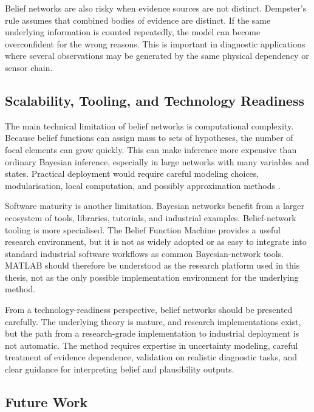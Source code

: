 \documentclass[runningheads]{llncs}
\begin{document}
Belief networks are also risky when evidence sources are not distinct. Dempster's rule assumes that combined bodies of evidence are distinct. If the same underlying information is counted repeatedly, the model can become overconfident for the wrong reasons. This is important in diagnostic applications where several observations may be generated by the same physical dependency or sensor chain.

\subsection{Scalability, Tooling, and Technology Readiness}
\label{sec:scalability_tooling_readiness}

The main technical limitation of belief networks is computational complexity. Because belief functions can assign mass to sets of hypotheses, the number of focal elements can grow quickly. This can make inference more expensive than ordinary Bayesian inference, especially in large networks with many variables and states. Practical deployment would require careful modeling choices, modularisation, local computation, and possibly approximation methods \cite{ShaferShenoyMellouli1987,Shenoy2023IncompleteBN}.

Software maturity is another limitation. Bayesian networks benefit from a larger ecosystem of tools, libraries, tutorials, and industrial examples. Belief-network tooling is more specialised. The Belief Function Machine provides a useful research environment, but it is not as widely adopted or as easy to integrate into standard industrial software workflows as common Bayesian-network tools. MATLAB should therefore be understood as the research platform used in this thesis, not as the only possible implementation environment for the underlying method.

From a technology-readiness perspective, belief networks should be presented carefully. The underlying theory is mature, and research implementations exist, but the path from a research-grade implementation to industrial deployment is not automatic. The method requires expertise in uncertainty modeling, careful treatment of evidence dependence, validation on realistic diagnostic tasks, and clear guidance for interpreting belief and plausibility outputs.

\subsection{Future Work}
\label{sec:future_work}
\end{document}

